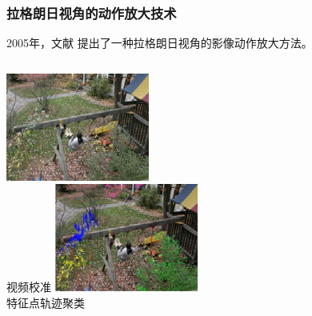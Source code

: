 \documentclass[xcolor=svgnames,serif,table,10pt]{beamer}
\begin{document}
\begin{frame}
  \frametitle{拉格朗日视角的动作放大技术}
  2005年，文献 \cite{liu2005motion} 提出了一种拉格朗日视角的影像动作放大方法。

  \medskip
  
  \begin{columns}
    \tiny
    \centering
    \includegraphics[width=\textwidth]{lag1.png}\\
    视频校准
    \centering
    \includegraphics[width=\textwidth]{lag2.png}\\
    特征点轨迹聚类
    \centering

\end{columns}
\end{frame}
\end{document}
